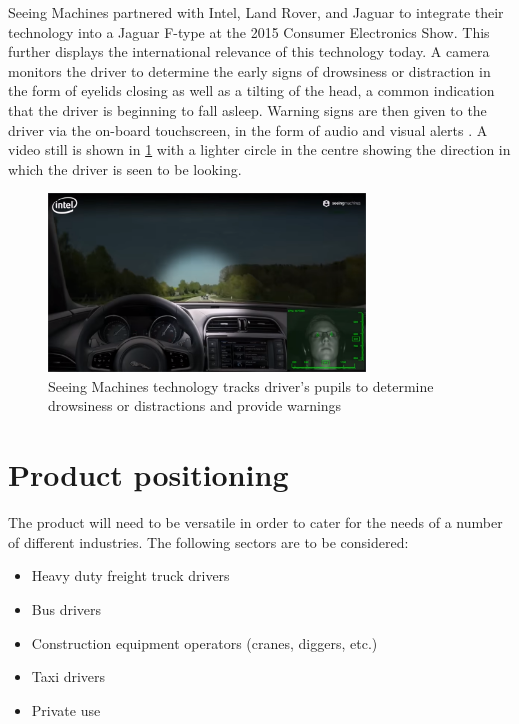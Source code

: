 Seeing Machines partnered with Intel, Land Rover, and Jaguar to integrate their technology into a Jaguar F-type at the 2015 Consumer Electronics Show. This further displays the international relevance of this technology today. A camera monitors the driver to determine the early signs of drowsiness or distraction in the form of eyelids closing as well as a tilting of the head, a common indication that the driver is beginning to fall asleep. Warning signs are then given to the driver via the on-board touchscreen, in the form of audio and visual alerts \cite{sm_similarities}. A video still is shown in \cref{fig:sm_video} with a lighter circle in the centre showing the direction in which the driver is seen to be looking.
\begin{figure}[H]
\centering
\includegraphics[width=0.75\textwidth]{images/seeingmachines.png}
\vskip10pt
\caption[Toyota driver alertness system]{Seeing Machines technology tracks driver's pupils to determine drowsiness or distractions and provide warnings \cite{sm_similarities}}
\label{fig:sm_video}
\end{figure}

\section{Product positioning}
The product will need to be versatile in order to cater for the needs of a number of different industries. The following sectors are to be considered:
\begin{itemize}
\item Heavy duty freight truck drivers
\item Bus drivers
\item Construction equipment operators (cranes, diggers, etc.)
\item Taxi drivers
\item Private use
\end{itemize}

